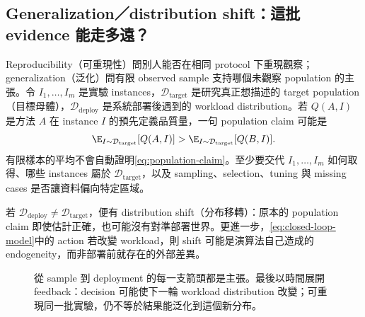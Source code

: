 \documentclass[11pt,a4paper,oneside,openany]{book}
\begin{document}
\subsection{Generalization／distribution shift：這批 evidence 能走多遠？}

Reproducibility（可重現性）問別人能否在相同 protocol 下重現觀察；generalization（泛化）問有限 observed sample 支持哪個未觀察 population 的主張。令 $I_1,\ldots,I_m$ 是實驗 instances，$\mathcal D_{\mathrm{target}}$ 是研究真正想描述的 target population（目標母體），$\mathcal D_{\mathrm{deploy}}$ 是系統部署後遇到的 workload distribution。若 $Q(A,I)$ 是方法 $A$ 在 instance $I$ 的預先定義品質量，一句 population claim 可能是
\begin{equation}
 \label{eq:population-claim}
 \E_{I\sim\mathcal D_{\mathrm{target}}}[Q(A,I)]
 >
 \E_{I\sim\mathcal D_{\mathrm{target}}}[Q(B,I)].
\end{equation}
有限樣本的平均不會自動證明\cref{eq:population-claim}。至少要交代 $I_1,\ldots,I_m$ 如何取得、哪些 instances 屬於 $\mathcal D_{\mathrm{target}}$，以及 sampling、selection、tuning 與 missing cases 是否讓資料偏向特定區域。

若 $\mathcal D_{\mathrm{deploy}}\ne\mathcal D_{\mathrm{target}}$，便有 distribution shift（分布移轉）：原本的 population claim 即使估計正確，也可能沒有對準部署世界。更進一步，\cref{eq:closed-loop-model}中的 action 若改變 workload，則 shift 可能是演算法自己造成的 endogeneity，而非部署前就存在的外部差異。

\begin{figure}[htbp]
\centering
{}
\caption{從 sample 到 deployment 的每一支箭頭都是主張。最後以時間展開 feedback：decision 可能使下一輪 workload distribution 改變；可重現同一批實驗，仍不等於結果能泛化到這個新分布。}
\label{fig:generalization-loop}
\end{figure}
\end{document}

